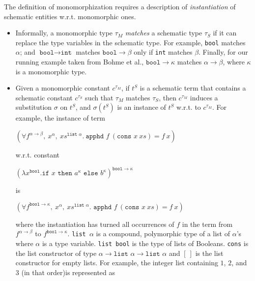 \documentclass{article}
\begin{document}
		The definition of monomorphization 
		requires a description of 
		\textit{instantiation} of schematic 
		entities w.r.t. 
		monomorphic ones.
		\begin{itemize}
		\item Informally, a monomorphic type 
			$\tau_M$ \textit{matches} a schematic 
			type $\tau_S$ if it can replace the 
			type variables in the schematic 
			type. For example, \texttt{bool} 
			matches $\alpha$; and $\texttt{bool} 
			\to \texttt{int}$ matches 
			$\texttt{bool} \to \beta$
			only if \texttt{int} matches 
			$\beta$. Finally, for our running 
			example taken from Bohme et al., 
			${\texttt{bool} \to \kappa}$
			matches $\alpha \to \beta$,
			where $\kappa$ is a monomorphic
			type. 
			
		\item Given a monomorphic constant 
			$c^{\tau_M}$,  if $t^S$ is a 
			schematic term that contains a 
			schematic constant $c^{\tau_S}$ 
			such that $\tau_M$ matches 
			$\tau_S$, then $c^{\tau_M}$ induces 
			a substitution $\sigma$ on $t^S$, 
			and $\sigma(t^S)$ is an instance of 
			$t^S$ w.r.t. to $c^{\tau_M}$. 
			For example, the instance of term
			\begin{center}
				$(\forall f^{\alpha \to \beta},\ 
				x^{\alpha},\ xs^{\texttt{list }
				\alpha}.\ \texttt{apphd }f\ 
				(\texttt{cons }x\ xs) = f\ x)$
			\end{center} 
			w.r.t. constant
			\begin{center}
				$(\lambda x^{\texttt{bool}}.
				\texttt{if }x\texttt{ then }
				a^{\kappa} \texttt{ else }
				b^{\kappa})^{\texttt{bool} \to 
				\kappa}$ 
			\end{center}
			is
			\begin{center}
				$(\forall f^{\texttt{bool} 
				\to \kappa},\ x^{\alpha},\ 
				xs^{\texttt{list }\alpha}. 
				\texttt{ apphd }f\ (\texttt{cons }
				x \ xs) = f\ x)$
			\end{center}
			where the instantiation 
			has turned all occurrences of $f$ 
			in the term from $f^{\alpha \to \beta}$ 
			to $f^{\texttt{bool} \to \kappa}$.
			\texttt{list $\alpha$} is a compound,
			polymorphic type of a list of 
			$\alpha$'s where $\alpha$ is a type 
			variable. \texttt{list bool} is the 
			type of lists of Booleans. \texttt{cons} 
			is the list constructor of type 
			$\alpha \to \texttt{list }\alpha \to 
			\texttt{list }\alpha$ and $[\ ]$ is 
			the list constructor for empty lists. 
			For example, the integer list 
			containing $1$, $2$, and $3$ (in that 
			order)is represented as 

\end{itemize}
\end{document}
